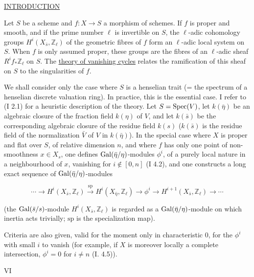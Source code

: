 
\thispagestyle{empty}
\begin{center}
\underline{INTRODUCTION}
\end{center}

Let $S$ be a scheme and $f:X\longrightarrow S$ a morphism of schemes. If $f$ is
proper and smooth, and if the prime number $\ell$ is invertible on $S$, the
$\ell$-adic cohomology groups $H^i(X_{\bar s},\mathbb Z_\ell)$ of the geometric
fibres of $f$ form an $\ell$-adic local system on $S$. When $f$ is only assumed
proper, these groups are the fibres of an $\ell$-adic sheaf
$R^i f_*\mathbb Z_\ell$ on $S$. The \underline{theory of vanishing cycles}
relates the ramification of this sheaf on $S$ to the singularities of $f$.

We shall consider only the case where $S$ is a henselian trait (= the spectrum
of a henselian discrete valuation ring). In practice, this is the essential
case. I refer to (I 2.1) for a heuristic description of the theory. Let
$S=\operatorname{Spec}(V)$, let $k(\bar\eta)$ be an algebraic closure of the fraction field
$k(\eta)$ of $V$, and let $k(\bar s)$ be the corresponding algebraic closure of
the residue field $k(s)$ ($k(\bar s)$ is the residue field of the normalization
$\bar V$ of $V$ in $k(\bar\eta)$). In the special case where $X$ is proper and
flat over $S$, of relative dimension $n$, and where $f$ has only one point of
non-smoothness $x\in X_s$, one defines $\operatorname{Gal}(\bar\eta/\eta)$-modules $\phi^i$,
of a purely local nature in a neighbourhood of $x$, vanishing for
$i\notin[0,n]$ (I 4.2), and one constructs a long exact sequence of
$\operatorname{Gal}(\bar\eta/\eta)$-modules

\[
\cdots \longrightarrow H^i(X_{\bar s},\mathbb Z_\ell)
\xrightarrow{\mathrm{sp}} H^i(X_{\bar\eta},\mathbb Z_\ell)
\longrightarrow \phi^i
\longrightarrow H^{i+1}(X_{\bar s},\mathbb Z_\ell)
\longrightarrow \cdots
\]

(the $\operatorname{Gal}(\bar s/s)$-module $H^i(X_{\bar s},\mathbb Z_\ell)$ is regarded as a
$\operatorname{Gal}(\bar\eta/\eta)$-module on which inertia acts trivially; $\mathrm{sp}$ is
the specialization map).

Criteria are also given, valid for the moment only in characteristic $0$, for
the $\phi^i$ with small $i$ to vanish (for example, if $X$ is moreover locally
a complete intersection, $\phi^i=0$ for $i\ne n$ (I. 4.5)).

\clearpage
\thispagestyle{empty}
\begin{center}
VI
\end{center}

